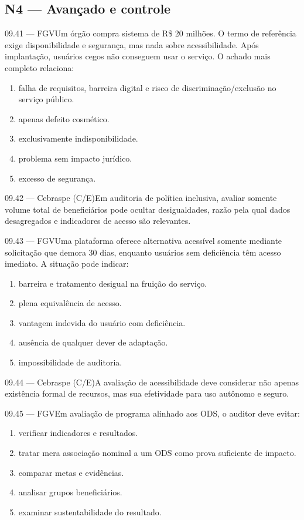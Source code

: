 \subsection*{N4 — Avançado e controle}
\begin{questao}{ 09.41 — FGV}Um órgão compra sistema de R\$ 20 milhões. O termo de referência exige disponibilidade e segurança, mas nada sobre acessibilidade. Após implantação, usuários cegos não conseguem usar o serviço. O achado mais completo relaciona:\begin{enumerate}[label=\Alph*)]\item falha de requisitos, barreira digital e risco de discriminação/exclusão no serviço público.\item apenas defeito cosmético.\item exclusivamente indisponibilidade.\item problema sem impacto jurídico.\item excesso de segurança.\end{enumerate}\end{questao}
\begin{questao}{ 09.42 — Cebraspe (C/E)}Em auditoria de política inclusiva, avaliar somente volume total de beneficiários pode ocultar desigualdades, razão pela qual dados desagregados e indicadores de acesso são relevantes.\end{questao}
\begin{questao}{ 09.43 — FGV}Uma plataforma oferece alternativa acessível somente mediante solicitação que demora 30 dias, enquanto usuários sem deficiência têm acesso imediato. A situação pode indicar:\begin{enumerate}[label=\Alph*)]\item barreira e tratamento desigual na fruição do serviço.\item plena equivalência de acesso.\item vantagem indevida do usuário com deficiência.\item ausência de qualquer dever de adaptação.\item impossibilidade de auditoria.\end{enumerate}\end{questao}
\begin{questao}{ 09.44 — Cebraspe (C/E)}A avaliação de acessibilidade deve considerar não apenas existência formal de recursos, mas sua efetividade para uso autônomo e seguro.\end{questao}
\begin{questao}{ 09.45 — FGV}Em avaliação de programa alinhado aos ODS, o auditor deve evitar:\begin{enumerate}[label=\Alph*)]\item verificar indicadores e resultados.\item tratar mera associação nominal a um ODS como prova suficiente de impacto.\item comparar metas e evidências.\item analisar grupos beneficiários.\item examinar sustentabilidade do resultado.\end{enumerate}\end{questao}
